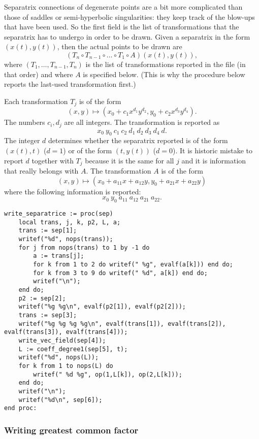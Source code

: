 \documentclass[a4paper,10pt]{article}
\begin{document}
Separatrix connections of degenerate points are a bit more complicated than those of saddles or semi-hyperbolic singularities: they keep track of the blow-ups that have been used.
So the first field is the list of transformations that the separatrix has to undergo in order to be drawn.  Given a separatrix in the form $(x(t),y(t))$, then the actual points to be drawn are
\[
    (T_{n}\circ T_{n-1}\circ\dots\circ T_1\circ A) (x(t),y(t)),
\]
where $(T_1,\dots,T_{n-1},T_n)$ is the list of transformations reported in the file (in that order) and where $A$ is specified below.  (This is why the procedure below reports the last-used transformation first.)

Each transformation $T_j$ is of the form
\[
    (x,y)\mapsto (x_0 + c_1x^{d_1}y^{d_2},y_0 + c_2x^{d_3}y^{d_4}).
\]
The numbers $c_i,d_j$ are all integers.  The transformation is reported as
\[
    x_0\: y_0\: c_1\: c_2\: d_1\: d_2\: d_3\: d_4\: d.
\]
The integer $d$ determines whether the separatrix reported is of the form $(x(t),t)$ ($d=1$) or of the form $(t,y(t))$ ($d=0$).  It is historic mistake to report $d$ together with $T_j$ because it is the same for all $j$ and it is information that really belongs with  $A$.  The transformation $A$ is of the form
\[
    (x,y) \mapsto (x_0 + a_{11}x + a_{12}y, y_0 + a_{21}x + a_{22}y)
\]
where the following information is reported:
\[
    x_0\: y_0\: a_{11}\: a_{12}\: a_{21}\: a_{22}.
\]


\begin{lstlisting}[name=writelog]
write_separatrice := proc(sep)
    local trans, j, k, p2, L, a;
    trans := sep[1];
    writef("%d", nops(trans));
    for j from nops(trans) to 1 by -1 do
        a := trans[j];
        for k from 1 to 2 do writef(" %g", evalf(a[k])) end do;
        for k from 3 to 9 do writef(" %d", a[k]) end do;
        writef("\n");
    end do;
    p2 := sep[2];
    writef("%g %g\n", evalf(p2[1]), evalf(p2[2]));
    trans := sep[3];
    writef("%g %g %g %g\n", evalf(trans[1]), evalf(trans[2]), evalf(trans[3]), evalf(trans[4]));
    write_vec_field(sep[4]);
    L := coeff_degree1(sep[5], t);
    writef("%d", nops(L));
    for k from 1 to nops(L) do
        writef(" %d %g", op(1,L[k]), op(2,L[k]));
    end do;
    writef("\n");
    writef("%d\n", sep[6]);
end proc:
\end{lstlisting}

\subsubsection{Writing greatest common factor}
\end{document}

